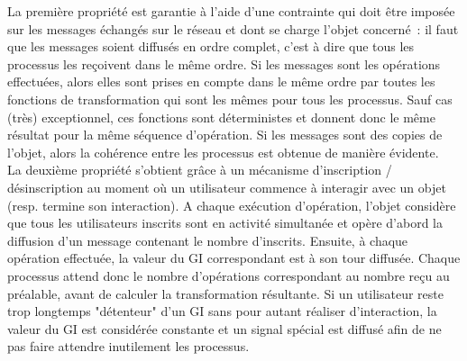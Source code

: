 \documentclass[11pt]{article}
\begin{document}
La première propriété est garantie à l'aide d'une contrainte qui doit être imposée sur les messages échangés sur le réseau et dont se charge l'objet concerné~: il faut que les messages soient diffusés en ordre complet, c'est à dire que tous les processus les reçoivent dans le même ordre. Si les messages sont les opérations effectuées, alors elles sont prises en compte dans le même ordre par toutes les fonctions de transformation qui sont les mêmes pour tous les processus. Sauf cas (très) exceptionnel, ces fonctions sont déterministes et donnent donc le même résultat pour la même séquence d'opération. Si les messages sont des copies de l'objet, alors la cohérence entre les processus est obtenue de manière évidente.
\\

La deuxième propriété s'obtient grâce à un mécanisme d'inscription / désinscription au moment où un utilisateur commence à interagir avec un objet (resp. termine son interaction). A chaque exécution d'opération, l'objet considère que tous les utilisateurs inscrits sont en activité simultanée et opère d'abord la diffusion d'un message contenant le nombre d'inscrits. Ensuite, à chaque opération effectuée, la valeur du GI correspondant est à son tour diffusée. Chaque processus attend donc le nombre d'opérations correspondant au nombre reçu au préalable, avant de calculer la transformation résultante. Si un utilisateur reste trop longtemps "détenteur" d'un GI sans pour autant réaliser d'interaction, la valeur du GI est considérée constante et un signal spécial est diffusé afin de ne pas faire attendre inutilement les processus.
\end{document}
